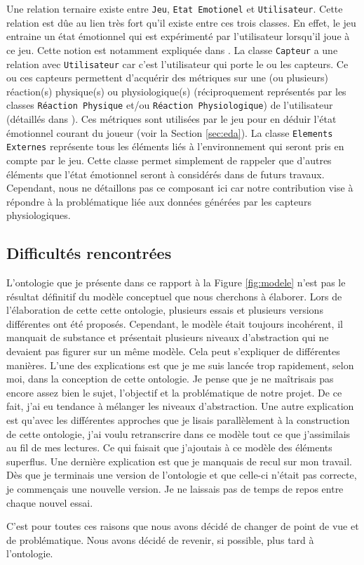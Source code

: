 \documentclass[11pt]{article}
\begin{document}
		Une relation ternaire existe entre \texttt{Jeu}, \texttt{Etat Emotionel} et \texttt{Utilisateur}.
		Cette relation est dûe au lien très fort qu'il existe entre ces trois classes.
		En effet, le jeu entraine un état émotionnel qui est expérimenté par l'utilisateur lorsqu'il joue à ce jeu.
		Cette notion est notamment expliquée dans \cite{calvo_et_al._2015}.
		La classe \texttt{Capteur} a une relation avec \texttt{Utilisateur} car c'est l'utilisateur qui porte le ou les capteurs.
		Ce ou ces capteurs permettent d'acquérir des métriques sur une (ou plusieurs) réaction(s) physique(s) ou physiologique(s) (réciproquement représentés par les classes \texttt{Réaction Physique} et/ou \texttt{Réaction Physiologique}) de l'utilisateur  (détaillés dans \cite{shu_et_al._2018}).
		Ces métriques sont utilisées par le jeu pour en déduir l'état émotionnel courant du joueur (voir la Section \ref{sec:eda}).
		La classe \texttt{Elements Externes} représente tous les éléments liés à l'environnement qui seront pris en compte par le jeu.
		Cette classe permet simplement de rappeler que d'autres éléments que l'état émotionnel seront à considérés dans de futurs travaux.
		Cependant, nous ne détaillons pas ce composant ici car notre contribution vise à répondre à la problématique liée aux données générées par les capteurs physiologiques.
	\subsection{Difficultés rencontrées}\label{sec:difficultes}
		L'ontologie que je présente dans ce rapport à la Figure \ref{fig:modele} n'est pas le résultat définitif du modèle conceptuel que nous cherchons à élaborer.
		Lors de l'élaboration de cette cette ontologie, plusieurs essais et plusieurs versions différentes ont été proposés.
		Cependant, le modèle était toujours incohérent, il manquait de substance et présentait plusieurs niveaux d'abstraction qui ne devaient pas figurer sur un même modèle. 
		Cela peut s'expliquer de différentes manières. 
		L'une des explications est que je me suis lancée trop rapidement, selon moi, dans la conception de cette ontologie.
		Je pense que je ne maîtrisais pas encore assez bien le sujet, l'objectif et la problématique de notre projet.
		De ce fait, j'ai eu tendance à mélanger les niveaux d'abstraction.
		Une autre explication est qu'avec les différentes approches que je lisais parallèlement à la construction de cette ontologie, j'ai voulu retranscrire dans ce modèle tout ce que j'assimilais au fil de mes lectures.
		Ce qui faisait que j'ajoutais à ce modèle des éléments superflus.
		Une dernière explication est que je manquais de recul sur mon travail.
		Dès que je terminais une version de l'ontologie et que celle-ci n'était pas correcte, je commençais une nouvelle version.
		Je ne laissais pas de temps de repos entre chaque nouvel essai.\par
		C'est pour toutes ces raisons que nous avons décidé de changer de point de vue et de problématique.
		Nous avons décidé de revenir, si possible, plus tard à l'ontologie.
\end{document}
